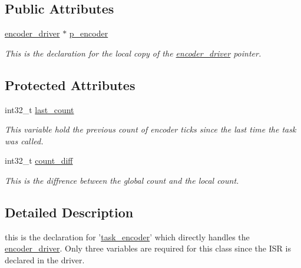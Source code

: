 \subsection*{Public Attributes}
\begin{DoxyCompactItemize}
\item 
\hypertarget{classtask__encoder_a93ba34cbfaf270161b396f276d7772d7}{\hyperlink{classencoder__driver}{encoder\-\_\-driver} $\ast$ \hyperlink{classtask__encoder_a93ba34cbfaf270161b396f276d7772d7}{p\-\_\-encoder}}\label{classtask__encoder_a93ba34cbfaf270161b396f276d7772d7}

\begin{DoxyCompactList}\small\item\em This is the declaration for the local copy of the \hyperlink{classencoder__driver}{encoder\-\_\-driver} pointer. \end{DoxyCompactList}\end{DoxyCompactItemize}
\subsection*{Protected Attributes}
\begin{DoxyCompactItemize}
\item 
\hypertarget{classtask__encoder_a00db1124d04019b3d945f4081310cb92}{int32\-\_\-t \hyperlink{classtask__encoder_a00db1124d04019b3d945f4081310cb92}{last\-\_\-count}}\label{classtask__encoder_a00db1124d04019b3d945f4081310cb92}

\begin{DoxyCompactList}\small\item\em This variable hold the previous count of encoder ticks since the last time the task was called. \end{DoxyCompactList}\item 
\hypertarget{classtask__encoder_a2a7938fe7c5ea145f553400ad53a2985}{int32\-\_\-t \hyperlink{classtask__encoder_a2a7938fe7c5ea145f553400ad53a2985}{count\-\_\-diff}}\label{classtask__encoder_a2a7938fe7c5ea145f553400ad53a2985}

\begin{DoxyCompactList}\small\item\em This is the diffrence between the global count and the local count. \end{DoxyCompactList}\end{DoxyCompactItemize}


\subsection{Detailed Description}
this is the declaration for '\hyperlink{classtask__encoder}{task\-\_\-encoder}' which directly handles the \hyperlink{classencoder__driver}{encoder\-\_\-driver}. Only three variables are required for this class since the I\-S\-R is declared in the driver. 

